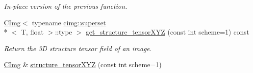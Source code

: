 \begin{DoxyCompactItemize}
\begin{DoxyCompactList}\small\item\em In-\/place version of the previous function. \end{DoxyCompactList}\item 
\hypertarget{structcimg__library_1_1_c_img_ac19d06a40e63de0b91168a7a935a0207}{\hyperlink{structcimg__library_1_1_c_img}{C\-Img}$<$ typename \hyperlink{structcimg__library_1_1cimg_1_1superset}{cimg\-::superset}\\*
$<$ T, float $>$\-::type $>$ \hyperlink{structcimg__library_1_1_c_img_ac19d06a40e63de0b91168a7a935a0207}{get\-\_\-structure\-\_\-tensor\-X\-Y\-Z} (const int scheme=1) const }\label{structcimg__library_1_1_c_img_ac19d06a40e63de0b91168a7a935a0207}

\begin{DoxyCompactList}\small\item\em Return the 3\-D structure tensor field of an image. \end{DoxyCompactList}\item 
\hypertarget{structcimg__library_1_1_c_img_adb7eeb782112814c00bf84b7fa396a42}{\hyperlink{structcimg__library_1_1_c_img}{C\-Img} \& \hyperlink{structcimg__library_1_1_c_img_adb7eeb782112814c00bf84b7fa396a42}{structure\-\_\-tensor\-X\-Y\-Z} (const int scheme=1)}\label{structcimg__library_1_1_c_img_adb7eeb782112814c00bf84b7fa396a42}


\end{DoxyCompactItemize}
